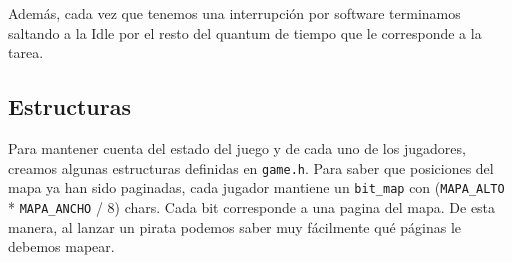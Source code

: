 Además, cada vez que tenemos una interrupción por software terminamos saltando a la Idle por el resto del quantum de tiempo que le corresponde a la tarea.

\subsection{Estructuras}

Para mantener cuenta del estado del juego y de cada uno de los jugadores, creamos algunas estructuras definidas en \texttt{game.h}. Para saber que posiciones del mapa ya han sido paginadas, cada jugador mantiene un \texttt{bit\_map} con (\texttt{MAPA\_ALTO} * \texttt{MAPA\_ANCHO} / 8) chars. Cada bit corresponde a una pagina del mapa. De esta manera, al lanzar un pirata podemos saber muy fácilmente qué páginas le debemos mapear.